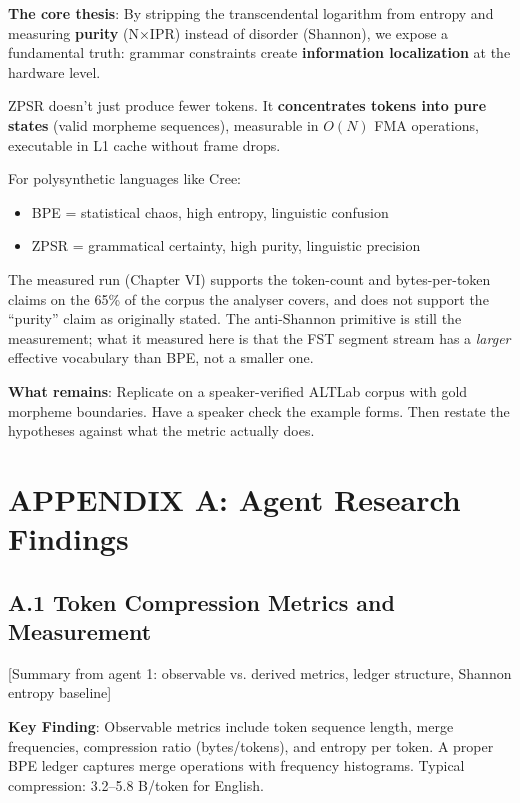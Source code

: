 \documentclass[11pt,oneside]{article}
\begin{document}
\textbf{The core thesis}: By stripping the transcendental logarithm from entropy and measuring \textbf{purity} (N×IPR) instead of disorder (Shannon), we expose a fundamental truth: grammar constraints create \textbf{information localization} at the hardware level.

ZPSR doesn't just produce fewer tokens. It \textbf{concentrates tokens into pure states} (valid morpheme sequences), measurable in $O(N)$ FMA operations, executable in L1 cache without frame drops.

For polysynthetic languages like Cree:
\begin{itemize}
  \item BPE = statistical chaos, high entropy, linguistic confusion
  \item ZPSR = grammatical certainty, high purity, linguistic precision
\end{itemize}

The measured run (Chapter VI) supports the token-count and bytes-per-token claims on the 65\% of the corpus the analyser covers, and does not support the ``purity'' claim as originally stated. The anti-Shannon primitive is still the measurement; what it measured here is that the FST segment stream has a \emph{larger} effective vocabulary than BPE, not a smaller one.

\textbf{What remains}: Replicate on a speaker-verified ALTLab corpus with gold morpheme boundaries. Have a speaker check the example forms. Then restate the hypotheses against what the metric actually does.

\appendix

\section{APPENDIX A: Agent Research Findings}

\subsection{A.1 Token Compression Metrics and Measurement}

[Summary from agent 1: observable vs. derived metrics, ledger structure, Shannon entropy baseline]

\textbf{Key Finding}: Observable metrics include token sequence length, merge frequencies, compression ratio (bytes/tokens), and entropy per token. A proper BPE ledger captures merge operations with frequency histograms. Typical compression: 3.2--5.8 B/token for English.
\end{document}

